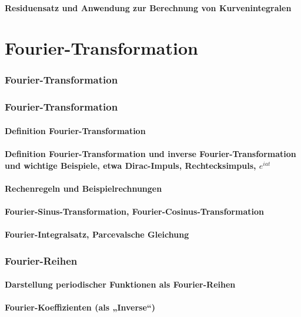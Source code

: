 \documentclass[a4paper]{article}
\begin{document}
\subsection{Residuensatz und Anwendung zur Berechnung von Kurvenintegralen}
\part{Fourier-Transformation}
\section{Fourier-Transformation}
\section{Fourier-Transformation}
\subsection{Definition Fourier-Transformation}
\subsection{Definition Fourier-Transformation und inverse Fourier-Transformation und wichtige Beispiele, etwa Dirac-Impuls, Rechtecksimpuls, $ e^{iat} $}
\subsection{Rechenregeln und Beispielrechnungen}
\subsection{Fourier-Sinus-Transformation, Fourier-Cosinus-Transformation}
\subsection{Fourier-Integralsatz, Parcevalsche Gleichung}
\section{Fourier-Reihen}
\subsection{Darstellung periodischer Funktionen als Fourier-Reihen}
\subsection{Fourier-Koeffizienten (als „Inverse“)}
\end{document}
